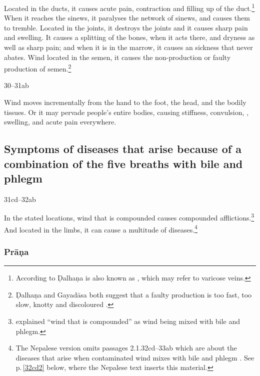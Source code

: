 \begin{translation}
Located in the ducts, it causes acute pain, contraction and filling up
of the duct.\footnote{According to Ḍalhaṇa  is also
    known as  \citep[262]{vulgate}, which may refer to
    varicose veins.} %
    When it reaches the sinews, it paralyses the network of sinews,
    and causes them to tremble.\label{ākṣepaka} %
    Located in the joints, it destroys the joints and it causes sharp
    pain and swelling. %
    It causes a splitting of the bones, when it acts there, and
    dryness as well as sharp pain; %
    and when it is in the marrow, it causes an sickness that never
    abates. %
    Wind located  in the semen, it  causes the non-production or faulty
    production of semen.\footnote{Ḍalhaṇa and Gayadāsa both suggest that
        a faulty production  is too fast, too
        slow, knotty and discoloured \cite[262]{vulgate}.}


\item[30--31ab]

Wind moves incrementally from the hand to the foot, the head, and the
bodily tissues.  Or it may pervade people's entire bodies, causing
stiffness, convulsion, , swelling, and acute pain
everywhere.



\subsection{Symptoms of diseases that arise because of a 
combination of the five breaths with bile and phlegm}

\item[31cd--32ab]

In the stated locations, wind that is compounded causes compounded
afflictions.\footnote{ explained “wind that is
    compounded” as wind being mixed with bile and phlegm.}  And located in
    the limbs, it can cause a multitude of
    diseases.\footnote{\label{32cd1}The Nepalese version omits passages
        2.1.32cd--33ab which are about the diseases that arise when 
        contaminated wind mixes with bile and phlegm \citep[263]{vulgate}. See
        p.\,\ref{32cd2} below, where the Nepalese text inserts this material.}


\subsubsection{Prāṇa}


\end{translation}
